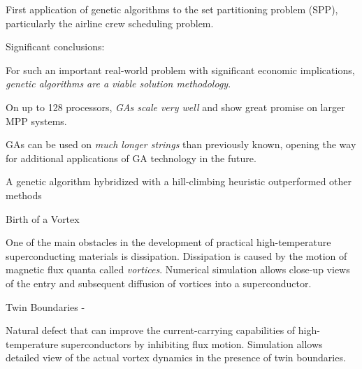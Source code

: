 \begin{small}
\begin{mainpts}
\item First application of genetic algorithms to the set  partitioning problem
(SPP), particularly the airline crew scheduling problem.

\item Significant conclusions:
\begin{secpts}
\item     For such an important
    real-world problem with significant economic implications, {\em  genetic
algorithms are a viable solution methodology}.
\item     On up to 128 processors, {\em GAs scale very well} and show great
promise on larger MPP     systems.
\item      GAs can be
used on {\em much longer strings} than previously     known, opening the way
for 
additional applications of GA technology in the future.  
\item      A genetic algorithm hybridized with a hill-climbing heuristic
outperformed other methods
\end{secpts}
\end{mainpts}

\end{small}
\ve

\begin{small}
\begin{mainpts}
\item  Birth of a Vortex

One of the main obstacles in the development of practical high-temperature
superconducting 
materials is dissipation. Dissipation is caused by the motion of magnetic flux
quanta called {\em vortices}.
Numerical simulation allows close-up views of the entry and subsequent
diffusion of vortices into a superconductor. 
 

\item Twin Boundaries -

Natural defect that can improve the
current-carrying capabilities of high-temperature superconductors by
inhibiting flux motion. 
Simulation allows detailed view of the actual vortex dynamics in the presence
of twin boundaries.  

\end{mainpts}
\end{small}
\ve

